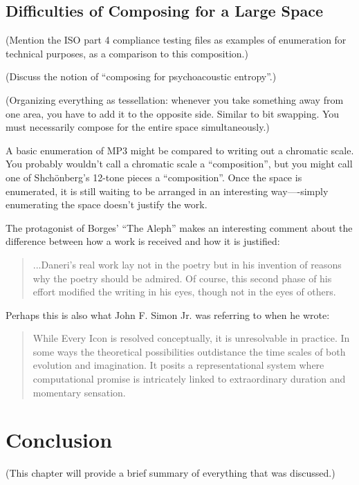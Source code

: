 \documentclass{thesis}
\begin{document}
\section{Difficulties of Composing for a Large Space}

	(Mention the ISO part 4 compliance testing files as examples of enumeration for technical purposes, as a comparison to this composition.)
	
	(Discuss the notion of ``composing for psychoacoustic entropy''.)
	
	(Organizing everything as tessellation: whenever you take something away from one area, you have to add it to the opposite side. Similar to bit swapping. You must necessarily compose for the entire space simultaneously.)
	
	A basic enumeration of MP3 might be compared to writing out a chromatic scale. You probably wouldn't call a chromatic scale a ``composition'', but you might call one of Shch\"onberg's 12-tone pieces a ``composition''. Once the space is enumerated, it is still waiting to be arranged in an interesting way----simply enumerating the space doesn't justify the work.

	The protagonist of Borges' ``The Aleph'' makes an interesting comment about the difference between how a work is received and how it is justified:
	
	\begin{quote}
	...Daneri's real work lay not in the poetry but in his invention of reasons why the poetry should be admired. Of course, this second phase of his effort modified the writing in his eyes, though not in the eyes of others.
	\end{quote}
	
	Perhaps this is also what John F. Simon Jr. was referring to when he wrote:
	
	\begin{quote}
	While Every Icon is resolved conceptually, it is unresolvable in practice. In some ways the theoretical possibilities outdistance the time scales of both evolution and imagination. It posits a representational system where computational promise is intricately linked to extraordinary duration and momentary sensation.\cite{john_f._simon_jr._given:32_1997}
	\end{quote}
	
\chapter{Conclusion}
	(This chapter will provide a brief summary of everything that was discussed.)
	
\end{document}
